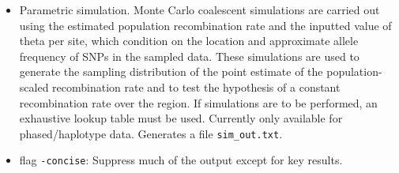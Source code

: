 \documentclass[a4paper,10pt,fullpage]{article}
\begin{document}
\begin{itemize}
\item Parametric simulation.  Monte Carlo coalescent simulations
are carried out using the estimated population recombination rate
and the inputted value of theta per site, which condition on the
location and approximate allele frequency of SNPs in the sampled
data.  These simulations are used to generate the sampling
distribution of the point estimate of the population-scaled
recombination rate and to test the hypothesis of a constant
recombination rate over the region.  If simulations are to be
performed, an exhaustive lookup table must be used. Currently only
available for phased/haplotype data. Generates a file {\verb+sim_out.txt+}.

\item flag \verb+-concise+: Suppress much of the output except for key results.
\end{itemize}
\end{document}
